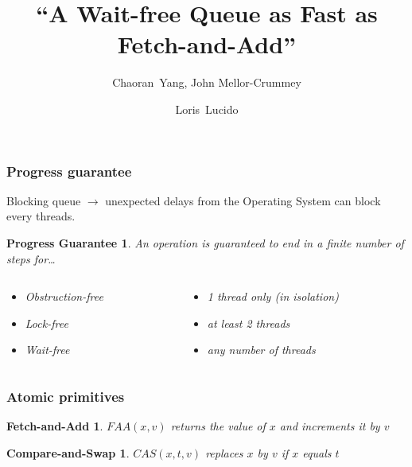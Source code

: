 \documentclass[10pt,a4paper]{beamer}
\title{``A Wait-free Queue as Fast as Fetch-and-Add'' }
\subtitle{Chaoran~Yang, John Mellor-Crummey}
\author[L. Lucido]{Loris~Lucido\\[-.25em]}
\institute[IR]{Lecture d'articles - Soutenance}
\date{\displaydate{date}}
\begin{document}
\begin{frame}
  \vspace{3.5em}
  \titlepage
\end{frame}


\begin{frame}
  \frametitle{Progress guarantee}
  Blocking queue $\rightarrow$ unexpected delays from the Operating System
  can block every threads. \center \vfill
  \newtheorem{progress}[theorem]{Progress Guarantee}
  \begin{progress}
    \center
    An operation is guaranteed to end in a finite number of steps for\ldots
    \begin{columns}
      \begin{column}{0.5\textwidth}
        \begin{itemize}
        \item Obstruction-free
        \item Lock-free
        \item Wait-free
        \end{itemize}
      \end{column}
      \begin{column}{0.5\textwidth}
        \begin{itemize}
        \item[] 1 thread only (in isolation)
        \item[] at least 2 threads
        \item[] any number of threads
        \end{itemize}
      \end{column}
    \end{columns}
  \end{progress}
\end{frame}

\begin{frame}
  \frametitle{Atomic primitives}
  \newtheorem{faa}[theorem]{Fetch-and-Add}
  \newtheorem{cas}[theorem]{Compare-and-Swap}
  \begin{faa}
    $FAA(x, v)$ returns the value of $x$ and increments it by $v$
  \end{faa}
  \vfill
  \begin{cas}
    $CAS(x,t,v)$ replaces $x$ by $v$ if $x$ equals $t$
  \end{cas}
\end{frame}
\end{document}
